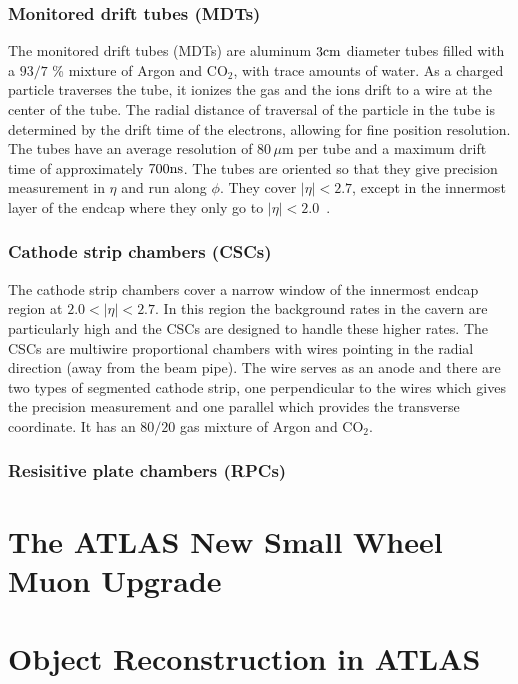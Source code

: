 \subsubsection{Monitored drift tubes (MDTs)}

The monitored drift tubes (MDTs) are aluminum $3 \rm cm$ diameter tubes filled with a $93/7$ \% mixture of Argon and $\textrm{CO}_2$, with trace amounts of water. As a charged particle traverses the tube, it ionizes the gas and the ions drift to a wire at the center of the tube. The radial distance of traversal of the particle in the tube is determined by the drift time of the electrons, allowing for fine position resolution. The tubes have an average resolution of $80\,\mu\textrm{m}$ per tube and a maximum drift time of approximately $700 \rm ns$. The tubes are oriented so that they give precision measurement in $\eta$ and run along $\phi$. They cover $|\eta| < 2.7$, except in the innermost layer of the endcap where they only go to $|\eta| < 2.0$~\cite{ATLASPaper}.

\subsubsection{Cathode strip chambers (CSCs)}

The cathode strip chambers cover a narrow window of the innermost endcap region at $2.0 < |\eta|< 2.7$. In this region the background rates in the cavern are particularly high and the CSCs are designed to handle these higher rates. The CSCs are multiwire proportional chambers with wires pointing in the radial direction (away from the beam pipe). The wire serves as an anode and there are two types of segmented cathode strip, one perpendicular to the wires which gives the precision measurement and one parallel which provides the transverse coordinate. It has an $80/20$ gas mixture of Argon and $\textrm{CO}_2$. 

\subsubsection{Resisitive plate chambers (RPCs)}






\section{The ATLAS New Small Wheel Muon Upgrade}

\section{Object Reconstruction in ATLAS}
